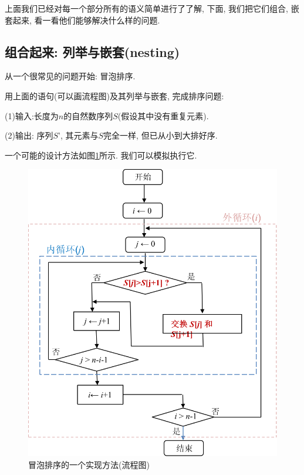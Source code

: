 上面我们已经对每一个部分所有的语义简单进行了了解, 下面, 我们把它们组合, 嵌套起来, 看一看他们能够解决什么样的问题. 

\subsection*{组合起来: 列举与嵌套(nesting)}

从一个很常见的问题开始: 冒泡排序. 

\begin{prob}
	用上面的语句(可以画流程图)及其列举与嵌套, 完成排序问题: 
	
	(1)输入:长度为$n$的自然数序列$S$(假设其中没有重复元素). 

	(2)输出: 序列$S’$, 其元素与$S$完全一样, 但已从小到大排好序.
\end{prob}

一个可能的设计方法如图\ref{fig:bub-sor}所示. 我们可以模拟执行它. 

\begin{figure}
	\centering
	\includegraphics[scale=0.5]{2-prop-logic/figs/bubble-sort}
	\caption{冒泡排序的一个实现方法(流程图)}
	\label{fig:bub-sor}
\end{figure}


